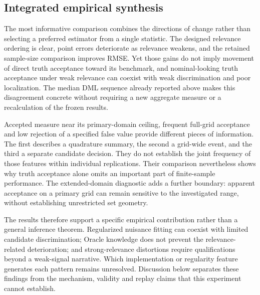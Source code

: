 \FloatBarrier

\subsection{Integrated empirical synthesis}
\label{sec:integrated-results}
The most informative comparison combines the directions of change rather than selecting a preferred estimator from a single statistic. The designed relevance ordering is clear, point errors deteriorate as relevance weakens, and the retained sample-size comparison improves RMSE. Yet those gains do not imply movement of direct truth acceptance toward its benchmark, and nominal-looking truth acceptance under weak relevance can coexist with weak discrimination and poor localization. The median DML sequence already reported above makes this disagreement concrete without requiring a new aggregate measure or a recalculation of the frozen results.

Accepted measure near its primary-domain ceiling, frequent full-grid acceptance and low rejection of a specified false value provide different pieces of information. The first describes a quadrature summary, the second a grid-wide event, and the third a separate candidate decision. They do not establish the joint frequency of those features within individual replications. Their comparison nevertheless shows why truth acceptance alone omits an important part of finite-sample performance. The extended-domain diagnostic adds a further boundary: apparent acceptance on a primary grid can remain sensitive to the investigated range, without establishing unrestricted set geometry.

The results therefore support a specific empirical contribution rather than a general inference theorem. Regularized nuisance fitting can coexist with limited candidate discrimination; Oracle knowledge does not prevent the relevance-related deterioration; and strong-relevance distortions require qualifications beyond a weak-signal narrative. Which implementation or regularity feature generates each pattern remains unresolved. Discussion below separates these findings from the mechanism, validity and replay claims that this experiment cannot establish.
